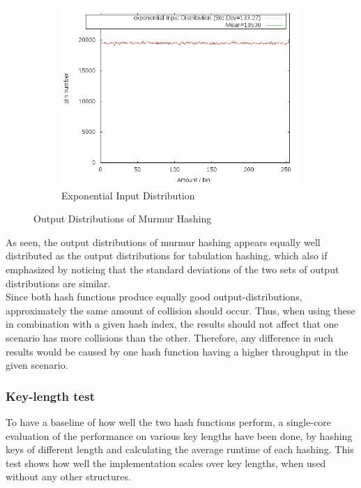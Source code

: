 \documentclass[11pt]{article} %
\begin{document}
\begin{figure}[H]\ContinuedFloat
    \centering
    \begin{subfigure}[b]{0.9\textwidth}
        \includegraphics[width=\textwidth]{Graphs/Dist/Murmur_exponential_dist.png}
        \caption{Exponential Input Distribution}
        \label{fig:murmur_dist_exp}
    \end{subfigure}
    \caption{Output Distributions of Murmur Hashing}\label{fig:murmur_dist}
\end{figure}
As seen, the output distributions of murmur hashing appears equally well distributed as the output distributions for tabulation hashing, which also if emphasized by noticing that the standard deviations of the two sets of output distributions are similar.\\

Since both hash functions produce equally good output-distributions, approximately the same amount of collision should occur. Thus, when using these in combination with a given hash index, the results should not affect that one scenario has more collisions than the other. Therefore, any difference in such results would be caused by one hash function having a higher throughput in the given scenario.

\subsubsection{Key-length test}
To have a baseline of how well the two hash functions perform, a single-core evaluation of the performance on various key lengths have been done, by hashing keys of different length and calculating the average runtime of each hashing. This test shows how well the implementation scales over key lengths, when used without any other structures. \\
\end{document}
